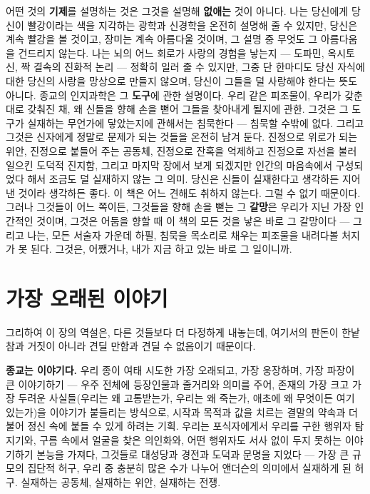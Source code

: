 어떤 것의 \textbf{기제}를 설명하는 것은 그것을 설명해 \textbf{없애는} 것이 아니다. 나는 당신에게 당신이 빨강이라는 색을 지각하는 광학과 신경학을 온전히 설명해 줄 수 있지만, 당신은 계속 빨강을 볼 것이고, 장미는 계속 아름다울 것이며, 그 설명 중 무엇도 그 아름다움을 건드리지 않는다. 나는 뇌의 어느 회로가 사랑의 경험을 낳는지 — 도파민, 옥시토신, 짝 결속의 진화적 논리 — 정확히 일러 줄 수 있지만, 그중 단 한마디도 당신 자식에 대한 당신의 사랑을 망상으로 만들지 않으며, 당신이 그들을 덜 사랑해야 한다는 뜻도 아니다. 종교의 인지과학은 그 \textbf{도구}에 관한 설명이다. 우리 같은 피조물이, 우리가 갖춘 대로 갖춰진 채, 왜 신들을 향해 손을 뻗어 그들을 찾아내게 될지에 관한. 그것은 그 도구가 실재하는 무언가에 닿았는지에 관해서는 침묵한다 — 침묵할 수밖에 없다. 그리고 그것은 신자에게 정말로 문제가 되는 것들을 온전히 남겨 둔다. 진정으로 위로가 되는 위안, 진정으로 붙들어 주는 공동체, 진정으로 잔혹을 억제하고 진정으로 자선을 불러일으킨 도덕적 진지함, 그리고 마지막 장에서 보게 되겠지만 인간의 마음속에서 구성되었다 해서 조금도 덜 실재하지 않는 그 의미. 당신은 신들이 실재한다고 생각하든 지어낸 것이라 생각하든 좋다. 이 책은 어느 견해도 취하지 않는다. 그럴 수 없기 때문이다. 그러나 그것들이 어느 쪽이든, 그것들을 향해 손을 뻗는 그 \textbf{갈망}은 우리가 지닌 가장 인간적인 것이며, 그것은 어둠을 향할 때 이 책의 모든 것을 낳은 바로 그 갈망이다 — 그리고 나는, 모든 서술자 가운데 하필, 침묵을 목소리로 채우는 피조물을 내려다볼 처지가 못 된다. 그것은, 어쨌거나, 내가 지금 하고 있는 바로 그 일이니까.

\section*{가장 오래된 이야기}

그리하여 이 장의 역설은, 다른 것들보다 더 다정하게 내놓는데, 여기서의 판돈이 한낱 참과 거짓이 아니라 견딜 만함과 견딜 수 없음이기 때문이다.

\textbf{종교는 이야기다.} 우리 종이 여태 시도한 가장 오래되고, 가장 웅장하며, 가장 파장이 큰 이야기하기 — 우주 전체에 등장인물과 줄거리와 의미를 주어, 존재의 가장 크고 가장 두려운 사실들(우리는 왜 고통받는가, 우리는 왜 죽는가, 애초에 왜 무엇이든 여기 있는가)을 이야기가 붙들리는 방식으로, 시작과 목적과 값을 치르는 결말의 약속과 더불어 정신 속에 붙들 수 있게 하려는 기획. 우리는 포식자에게서 우리를 구한 행위자 탐지기와, 구름 속에서 얼굴을 찾은 의인화와, 어떤 행위자도 서사 없이 두지 못하는 이야기하기 본능을 가져다, 그것들로 대성당과 경전과 도덕과 문명을 지었다 — 가장 큰 규모의 집단적 허구, 우리 중 충분히 많은 수가 나누어 앤더슨의 의미에서 실재하게 된 허구. 실재하는 공동체, 실재하는 위안, 실재하는 전쟁.

